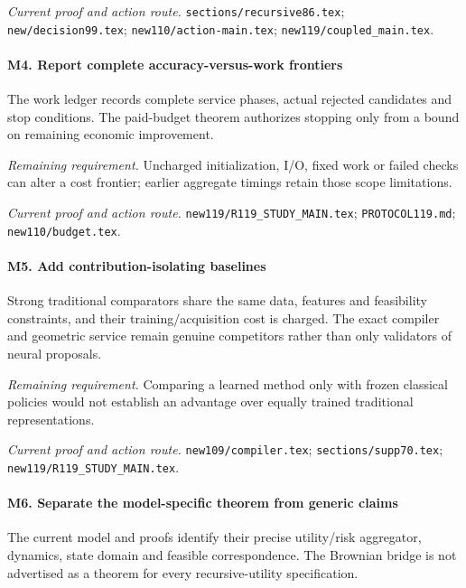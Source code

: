 \par\emph{Current proof and action route.} \nolinkurl{sections/recursive86.tex}; \nolinkurl{new/decision99.tex}; \nolinkurl{new110/action-main.tex}; \nolinkurl{new119/coupled_main.tex}.

\paragraph{M4. Report complete accuracy-versus-work frontiers}

The work ledger records complete service phases, actual rejected candidates and stop conditions. The paid-budget theorem authorizes stopping only from a bound on remaining economic improvement.

\par\emph{Remaining requirement.} Uncharged initialization, I/\allowbreak{}O, fixed work or failed checks can alter a cost frontier; earlier aggregate timings retain those scope limitations.

\par\emph{Current proof and action route.} \nolinkurl{new119/R119_STUDY_MAIN.tex}; \nolinkurl{PROTOCOL119.md}; \nolinkurl{new110/budget.tex}.

\paragraph{M5. Add contribution-isolating baselines}

Strong traditional comparators share the same data, features and feasibility constraints, and their training/\allowbreak{}acquisition cost is charged. The exact compiler and geometric service remain genuine competitors rather than only validators of neural proposals.

\par\emph{Remaining requirement.} Comparing a learned method only with frozen classical policies would not establish an advantage over equally trained traditional representations.

\par\emph{Current proof and action route.} \nolinkurl{new109/compiler.tex}; \nolinkurl{sections/supp70.tex}; \nolinkurl{new119/R119_STUDY_MAIN.tex}.

\paragraph{M6. Separate the model-specific theorem from generic claims}

The current model and proofs identify their precise utility/\allowbreak{}risk aggregator, dynamics, state domain and feasible correspondence. The Brownian bridge is not advertised as a theorem for every recursive-utility specification.

